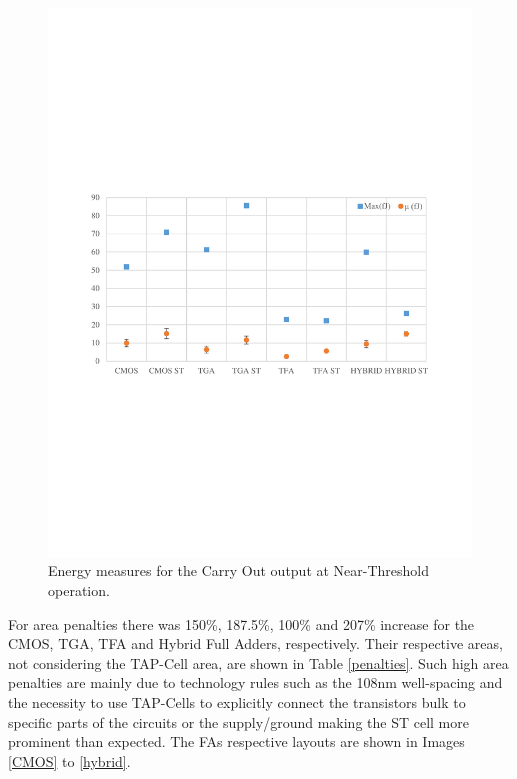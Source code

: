\documentclass[ecp,tc, english]{iiufrgs}
\begin{document}
\begin{figure}[H]
\centering
\includegraphics[width=\textwidth, trim={0 9cm 0 9cm},clip]{energyNTCarryOut.pdf}
\caption{Energy measures for the Carry Out output at Near-Threshold operation.}
\label{fig:energyNTCO}
\end{figure}

For area penalties there was 150\%, 187.5\%, 100\% and 207\% increase for the CMOS, TGA, TFA and Hybrid Full Adders, respectively. Their respective areas, not considering the TAP-Cell area, are shown in Table \ref{penalties}. Such high area penalties are mainly due to technology rules such as the 108nm well-spacing and the necessity to use TAP-Cells to explicitly connect the transistors bulk to specific parts of the circuits or the supply/ground making the ST cell more prominent than expected. The FAs respective layouts are shown in Images \ref{CMOS} to \ref{hybrid}.
\end{document}

